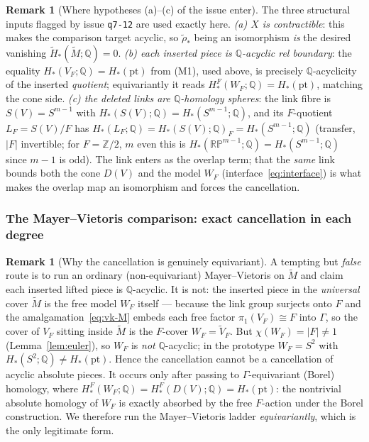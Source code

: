 \documentclass[12pt]{article}
\theoremstyle{definition}
\newtheorem{remark}[theorem]{Remark}
\begin{document}
\begin{remark}[Where hypotheses (a)--(c) of the issue enter]
The three structural inputs flagged by issue \texttt{q7-12} are used exactly here.
\emph{(a) $X$ is contractible}: this makes the comparison target acyclic, so
$\widetilde\rho_*$ being an isomorphism \emph{is} the desired vanishing
$\widetilde H_*(\widetilde M;\mathbb{Q})=0$. \emph{(b) each inserted piece is
$\mathbb{Q}$-acyclic rel boundary}: the equality $H_*(V_F;\mathbb{Q})=
H_*(\mathrm{pt})$ from (M1), used above, is precisely $\mathbb{Q}$-acyclicity of
the inserted \emph{quotient}; equivariantly it reads
$H^F_*(W_F;\mathbb{Q})=H_*(\mathrm{pt})$, matching the cone side. \emph{(c) the
deleted links are $\mathbb{Q}$-homology spheres}: the link fibre is $S(V)=S^{m-1}$
with $H_*(S(V);\mathbb{Q})=H_*(S^{m-1};\mathbb{Q})$, and its $F$-quotient
$L_F=S(V)/F$ has $H_*(L_F;\mathbb{Q})=H_*(S(V);\mathbb{Q})_F=H_*(S^{m-1};\mathbb{Q})$
(transfer, $|F|$ invertible; for $F=\mathbb{Z}/2$, $m$ even this is
$H_*(\mathbb{RP}^{m-1};\mathbb{Q})=H_*(S^{m-1};\mathbb{Q})$ since $m-1$ is odd).
The link enters as the overlap term; that the \emph{same} link bounds both the cone
$D(V)$ and the model $W_F$ (interface~\eqref{eq:interface}) is what makes the
overlap map an isomorphism and forces the cancellation.
\end{remark}

\subsubsection*{The Mayer--Vietoris comparison: exact cancellation in each degree}

\begin{remark}[Why the cancellation is genuinely equivariant]
\label{rem:whyequiv}
A tempting but \emph{false} route is to run an ordinary (non-equivariant)
Mayer--Vietoris on $\widetilde M$ and claim each inserted lifted piece is
$\mathbb{Q}$-acyclic. It is not: the inserted piece in the \emph{universal} cover
$\widetilde M$ is the free model $W_F$ itself --- because the link group surjects
onto $F$ and the amalgamation~\eqref{eq:vk-M} embeds each free factor
$\pi_1(V_F)\cong F$ into $\Gamma$, so the cover of $V_F$ sitting inside
$\widetilde M$ is the $F$-cover $W_F=\widetilde V_F$. But
$\chi(W_F)=|F|\neq1$ (Lemma~\ref{lem:euler}), so $W_F$ is \emph{not}
$\mathbb{Q}$-acyclic; in the prototype $W_F=S^2$ with $H_*(S^2;\mathbb{Q})\neq
H_*(\mathrm{pt})$. Hence the cancellation cannot be a cancellation of acyclic
absolute pieces. It occurs only after passing to $\Gamma$-equivariant (Borel)
homology, where $H^F_*(W_F;\mathbb{Q})=H^F_*(D(V);\mathbb{Q})=H_*(\mathrm{pt})$:
the nontrivial absolute homology of $W_F$ is exactly absorbed by the free
$F$-action under the Borel construction. We therefore run the Mayer--Vietoris
ladder \emph{equivariantly}, which is the only legitimate form.
\end{remark}
\end{document}
